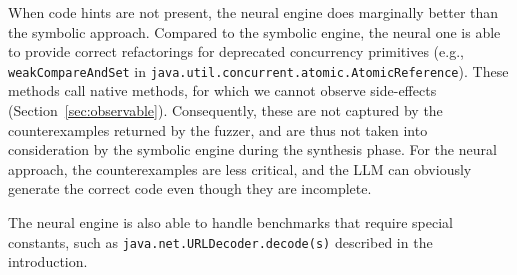 \documentclass[conference]{IEEEtran}
\begin{document}
When code hints are not present, the neural engine does mar\-gin\-al\-ly better
than the symbolic approach.
%
%
%
%
Compared to the symbolic engine, the neural one is able to provide correct
refactorings for deprecated concurrency primitives (e.g.,
\lstinline{weakCompareAndSet} in
\lstinline[breaklines=true]{java.util.concurrent.atomic.AtomicReference}). 
These methods call native methods, for which we cannot observe side-effects
(Section~\ref{sec:observable}).  Consequently, these are not captured by
the counterexamples returned by the fuzzer, and are thus not taken into
consideration by the symbolic engine during the synthesis phase.  For the
neural approach, the counterexamples are less critical, and the LLM can
obviously generate the correct code even though they are incomplete.

%
The neural engine is also able to handle benchmarks that require special
constants, such as
\lstinline[breaklines=true]{java.net.URLDecoder.decode(s)} described in the
introduction.






\end{document}
